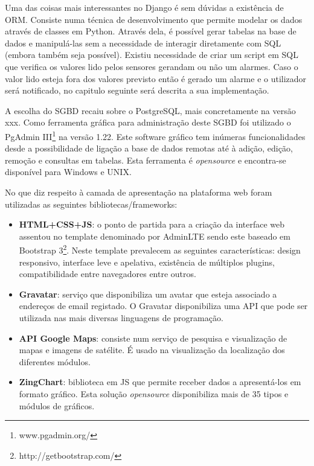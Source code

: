 Uma das coisas mais interessantes no Django é sem dúvidas a existência de \ac{ORM}. Consiste numa técnica de desenvolvimento que permite modelar os dados através de classes em Python. Através dela, é possível gerar tabelas na base de dados e manipulá-las sem a necessidade de interagir diretamente com \ac{SQL} (embora também seja possível). Existiu necessidade de criar um script em \ac{SQL} que verifica os valores lido pelos sensores gerandam ou não um alarmes. Caso o valor lido esteja fora dos valores previsto então é gerado um alarme e o utilizador será notificado, no capitulo seguinte será descrita a sua implementação. 

A escolha do \ac{SGBD} recaiu sobre o PostgreSQL, mais concretamente na versão xxx. Como ferramenta gráfica para administração deste \ac{SGBD} foi utilizado o PgAdmin III\footnote{www.pgadmin.org/} na versão 1.22. Este software gráfico tem inúmeras funcionalidades desde a possibilidade de ligação a base de dados remotas até à adição, edição, remoção e  consultas em tabelas. Esta ferramenta é \textit{opensource} e encontra-se disponível para Windows e UNIX.


No que diz respeito à camada de apresentação na plataforma web foram utilizadas as seguintes bibliotecas/frameworks: 

\begin{itemize}
	\item \textbf{\ac{HTML}+\ac{CSS}+\ac{JS}}: o ponto de partida para a criação da interface web assentou no template denominado por AdminLTE sendo este baseado em Bootstrap 3\footnote{http://getbootstrap.com/}. Neste template prevalecem as seguintes características:  design responsivo, interface leve e apelativa, existência de múltiplos plugins, compatibilidade entre navegadores entre outros. 
	
	\item \textbf{Gravatar}: serviço que disponibiliza um avatar que esteja associado a endereços de email registado. O Gravatar disponibiliza uma API que pode ser utilizada nas mais diversas linguagens de programação\cite{gravatar}.
	 
	\item \textbf{\ac{API} Google Maps}: consiste num serviço de pesquisa e visualização de mapas e imagens de satélite. É usado na visualização da localização dos diferentes módulos. 
	
	\item \textbf{ZingChart}: biblioteca em \ac{JS} que permite receber dados a apresentá-los em formato gráfico. Esta solução \textit{opensource} disponibiliza mais de 35 tipos e módulos de gráficos. 
\end{itemize}




